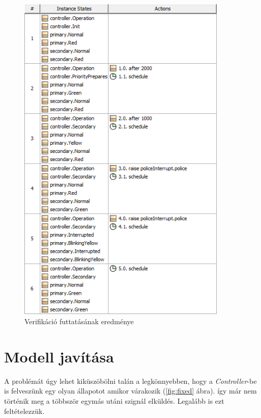 \begin{figure}[!ht]
	\centering
	\includegraphics[width=10cm, keepaspectratio]{figures/contribution/traces_example.png}
	\caption{Verifikáció futtatásának eredménye}
	\label{fig:traces-example}
\end{figure}


\newpage
\section{Modell javítása}

A problémát úgy lehet kiküszöbölni talán a legkönnyebben, hogy a \emph{Controller}-be is felveszünk egy olyan állapotot amikor várakozik (\ref{fig:fixed} ábra). így már nem történik meg a többször egymás utáni szignál elküldés. Legalább is ezt feltételezzük.

